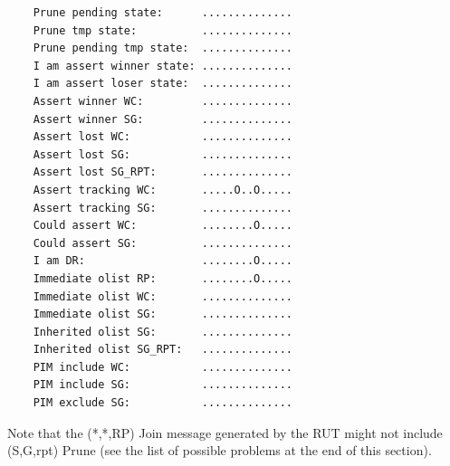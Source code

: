 \documentclass[11pt]{report}
\begin{document}
\begin{itemize}
\begin{verbatim}
    Prune pending state:      ..............
    Prune tmp state:          ..............
    Prune pending tmp state:  ..............
    I am assert winner state: ..............
    I am assert loser state:  ..............
    Assert winner WC:         ..............
    Assert winner SG:         ..............
    Assert lost WC:           ..............
    Assert lost SG:           ..............
    Assert lost SG_RPT:       ..............
    Assert tracking WC:       .....O..O.....
    Assert tracking SG:       ..............
    Could assert WC:          ........O.....
    Could assert SG:          ..............
    I am DR:                  ........O.....
    Immediate olist RP:       ........O.....
    Immediate olist WC:       ..............
    Immediate olist SG:       ..............
    Inherited olist SG:       ..............
    Inherited olist SG_RPT:   ..............
    PIM include WC:           ..............
    PIM include SG:           ..............
    PIM exclude SG:           ..............
\end{verbatim}

  Note that the (*,*,RP) Join message generated by the RUT might not include
  (S,G,rpt) Prune (see the list of possible problems at the end of this
  section).

\end{itemize}

\end{document}
